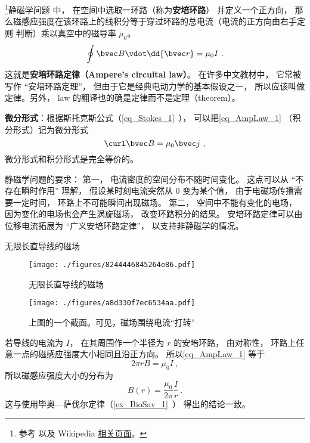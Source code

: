 

\footnote{参考 \cite{GriffE} 以及 Wikipedia \href{https://en.wikipedia.org/wiki/Amp\%C3\%A8re's_circuital_law}{相关页面}。}静磁学问题%
中， 在空间中选取一环路（称为\textbf{安培环路}） 并定义一个正方向， 那么磁感应强度在该环路上的线积分等于穿过环路的总电流（电流的正方向由右手定则 判断）乘以真空中的磁导率 $\mu_0$。
\begin{equation}\label{eq_AmpLaw_1}
\oint \bvec B \vdot \dd{\bvec r} = \mu_0 I~.
\end{equation}
这就是\textbf{安培环路定律（Ampere's circuital law）}。 在许多中文教材中， 它常被写作 “安培环路定理”， 但由于它是经典电动力学的基本假设之一， 所以应该叫做定律。另外， law 的翻译也的确是定律而不是定理（theorem）。

\textbf{微分形式}：根据斯托克斯公式（\autoref{eq_Stokes_1}~）， 可以把\autoref{eq_AmpLaw_1} （积分形式）记为微分形式
\begin{equation}\label{eq_AmpLaw_2}
\curl \bvec B = \mu_0 \bvec j~,
\end{equation}
微分形式和积分形式是完全等价的。

静磁学问题的要求： 第一， 电流密度的空间分布不随时间变化。 这点可以从 “不存在瞬时作用” 理解， 假设某时刻电流突然从 0 变为某个值， 由于电磁场传播需要一定时间， 环路上不可能瞬间出现磁场。 第二， 空间中不能有变化的电场， 因为变化的电场也会产生涡旋磁场， 改变环路积分的结果。 安培环路定律可以由位移电流拓展为 “广义安培环路定律”， 以支持非静磁学的情况。

\begin{example}{无限长直导线的磁场}\label{ex_AmpLaw_1}
\begin{figure}[ht]
\centering
\texttt{[image: ./figures/8244446845264e86.pdf]}
\caption{无限长直导线的磁场} \label{fig_AmpLaw_2}
\end{figure}

\begin{figure}[ht]
\centering
\texttt{[image: ./figures/a8d330f7ec6534aa.pdf]}
\caption{上图的一个截面。可见，磁场围绕电流“打转”} \label{fig_AmpLaw1}
\end{figure}

若导线的电流为 $I$， 在其周围作一个半径为 $r$ 的安培环路， 由对称性， 环路上任意一点的磁感应强度大小相同且沿正方向。 所以\autoref{eq_AmpLaw_1} 等于
\begin{equation}
2\pi r B = \mu_0 I~,
\end{equation}
所以磁感应强度大小的分布为
\begin{equation}
B(r) = \frac{\mu_0}{2\pi} \frac Ir~.
\end{equation}
这与使用毕奥—萨伐尔定律（\autoref{ex_BioSav_1}~） 得出的结论一致。
\end{example}

